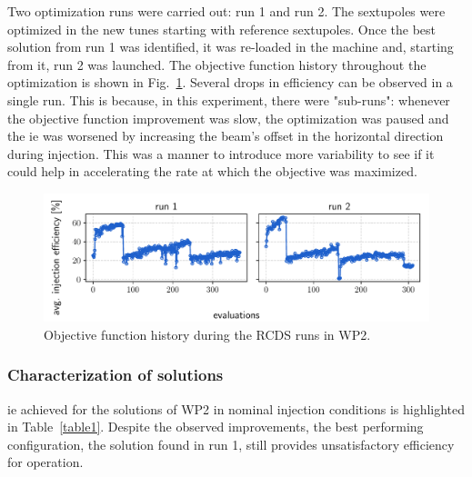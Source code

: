 Two optimization runs were carried out: run 1 and run 2. The sextupoles were optimized in the new tunes starting with reference sextupoles. Once the best solution from run 1 was identified, it was re-loaded in the machine and, starting from it, run 2 was launched. The objective function history throughout the optimization is shown in Fig.~\ref{fig:wp_2_history}. Several drops in efficiency can be observed in a single run. This is because, in this experiment, there were "sub-runs": whenever the objective function improvement was slow, the optimization was paused and the \gls*{ie} was worsened by increasing the beam's offset in the horizontal direction during injection. This was a manner to introduce more variability to see if it could help in accelerating the rate at which the objective was maximized.
\begin{figure}[htb]
    \includegraphics[width=\columnwidth]{Images/wp2_objfunc_hist.pdf}
    \caption[Objective function history during the RCDS runs in WP2.]{Objective function history during the \gls*{RCDS} runs in \gls*{WP2}.}
    \label{fig:wp_2_history}
\end{figure}
\subsubsection{Characterization of solutions}
\gls*{ie}  achieved for the solutions of \gls*{WP2} in nominal injection conditions is highlighted in Table~\ref{table1}. Despite the observed improvements, the best performing configuration, the solution found in run 1, still provides unsatisfactory efficiency for operation.

